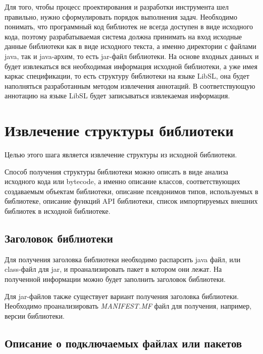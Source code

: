 Для того, чтобы процесс проектирования и разработки инструмента шел правильно, нужно сформулировать порядок выполнения задач.
Необходимо понимать, что программный код библиотек не всегда доступен в виде исходного кода, поэтому разрабатываемая система должна принимать на вход исходные данные библиотеки как в виде исходного текста, а именно директории с файлами java, так и java-архим, то есть jar-файл библиотеки.
На основе входных данных и будет извлекаться вся необходимая информация исходной библиотеки, а уже имея каркас спецификации, то есть структуру библиотеки на языке LibSL, она будет наполняться разработанным методом извлечения аннотаций.
В соответствующую аннотацию на языке LibSL будет записываться извлекаемая информация.

\section{Извлечение структуры библиотеки}

Целью этого шага является извлечение структуры из исходной библиотеки.

Способ получения структуры библиотеки можно описать в виде анализа исходного кода или bytecode, а именно описание классов, соответствующих создаваемым объектам библиотеки, описание псевдонимов типов, используемых в библиотеке, описание функций API библиотеки, список импортируемых внешних библиотек в исходной библиотеке.

\subsection{Заголовок библиотеки}

Для получения заголовка библиотеки необходимо распарсить java файл, или class-файл для jar, и проанализировать пакет в котором они лежат.
На полученной информации можно будет заполнить заголовок библиотеки.

Для jar-файлов также существует вариант получения заголовка библиотеки. Необходимо проанализировать \textit{MANIFEST.MF} файл для получения, например, версии библиотеки.

\subsection{Описание о подключаемых файлах или пакетов}


